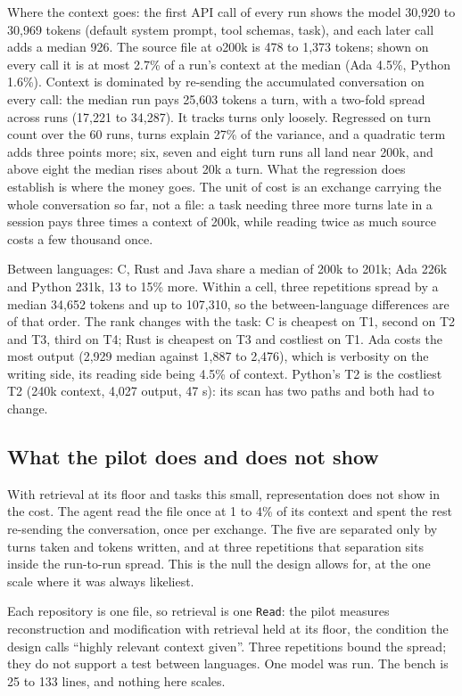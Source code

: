 \documentclass[11pt,a4paper]{article}
\begin{document}
Where the context goes: the first API call of every run shows the model 30,920 to 30,969 tokens (default system prompt, tool schemas, task), and each later call adds a median 926. The source file at o200k is 478 to 1,373 tokens; shown on every call it is at most 2.7\% of a run's context at the median (Ada 4.5\%, Python 1.6\%). Context is dominated by re-sending the accumulated conversation on every call: the median run pays 25,603 tokens a turn, with a two-fold spread across runs (17,221 to 34,287). It tracks turns only loosely. Regressed on turn count over the 60 runs, turns explain 27\% of the variance, and a quadratic term adds three points more; six, seven and eight turn runs all land near 200k, and above eight the median rises about 20k a turn. What the regression does establish is where the money goes. The unit of cost is an exchange carrying the whole conversation so far, not a file: a task needing three more turns late in a session pays three times a context of 200k, while reading twice as much source costs a few thousand once.

Between languages: C, Rust and Java share a median of 200k to 201k; Ada 226k and Python 231k, 13 to 15\% more. Within a cell, three repetitions spread by a median 34,652 tokens and up to 107,310, so the between-language differences are of that order. The rank changes with the task: C is cheapest on T1, second on T2 and T3, third on T4; Rust is cheapest on T3 and costliest on T1. Ada costs the most output (2,929 median against 1,887 to 2,476), which is verbosity on the writing side, its reading side being 4.5\% of context. Python's T2 is the costliest T2 (240k context, 4,027 output, 47 s): its scan has two paths and both had to change.

\subsection{What the pilot does and does not show}

With retrieval at its floor and tasks this small, representation does not show in the cost. The agent read the file once at 1 to 4\% of its context and spent the rest re-sending the conversation, once per exchange. The five are separated only by turns taken and tokens written, and at three repetitions that separation sits inside the run-to-run spread. This is the null the design allows for, at the one scale where it was always likeliest.

Each repository is one file, so retrieval is one \texttt{Read}: the pilot measures reconstruction and modification with retrieval held at its floor, the condition the design calls ``highly relevant context given''. Three repetitions bound the spread; they do not support a test between languages. One model was run. The bench is 25 to 133 lines, and nothing here scales.
\end{document}
